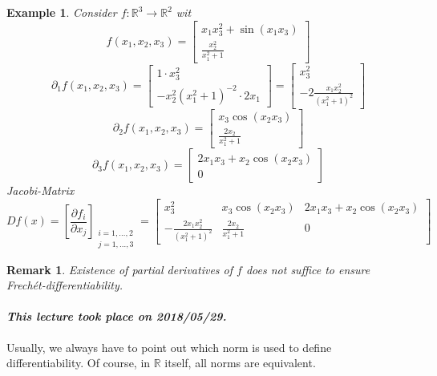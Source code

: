 \documentclass{article}
\newtheorem{example}{Example}  \numberwithin{example}{section}
\newtheorem{remark}{Remark}  \numberwithin{remark}{section}
\newcommand{\dateref}[1]{\paragraph{\textit{This lecture took place on #1.}}}
\begin{document}
\begin{example}
  Consider $f: \mathbb R^3 \to \mathbb R^2$ wit
  \[
    f(x_1, x_2, x_3) = \begin{bmatrix}
      x_1 x_3^2 + \sin(x_1 x_3) \\
      \frac{x_2^2}{x_1^2 + 1}
    \end{bmatrix}
  \]
  \[
    \partial_1 f(x_1, x_2, x_3) = \begin{bmatrix}
      1 \cdot x_3^2 \\
      -x_2^2 (x_1^2 + 1)^{-2} \cdot 2x_1
    \end{bmatrix} = \begin{bmatrix}
      x_3^2 \\
      -2 \frac{x_1 x_2^2}{(x_1^2 + 1)^2}
    \end{bmatrix}
  \] \[
    \partial_2 f(x_1, x_2, x_3) = \begin{bmatrix}
      x_3 \cos(x_2 x_3) \\
      \frac{2x_2}{x_1^2 + 1}
    \end{bmatrix}
  \] \[
    \partial_3 f(x_1, x_2, x_3) = \begin{bmatrix}
      2x_1 x_3 + x_2 \cos(x_2 x_3) \\
      0
    \end{bmatrix}
  \]
  Jacobi-Matrix
  \[
    Df(x)
    = \left[\frac{\partial f_i}{\partial x_j}\right]_{\substack{i = 1,\dots,2 \\ j = 1,\dots,3}}
    = \begin{bmatrix}
      x_3^2 & x_3 \cos(x_2 x_3) & 2 x_1 x_3 + x_2 \cos(x_2 x_3) \\
      - \frac{2x_1 x_2^2}{(x_1^2 + 1)^2} & \frac{2x_2}{x_1^2 + 1} & 0
    \end{bmatrix}
  \]
\end{example}

\begin{remark}
  Existence of partial derivatives of $f$ does not suffice to ensure Frech\'et-differentiability.
\end{remark}

\dateref{2018/05/29}

Usually, we always have to point out which norm is used to define differentiability.
Of course, in $\mathbb R$ itself, all norms are equivalent.
\end{document}
